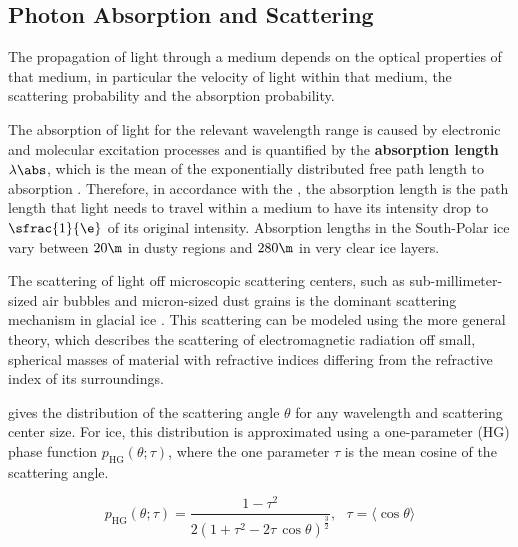 \subsection{Photon Absorption and Scattering}
\label{sec:scattering}

The propagation of light through a medium depends on the optical properties of that medium, in particular the velocity of light within that medium, the scattering probability and the absorption probability. \cite{lundberg}

The absorption of light for the relevant wavelength range is caused by electronic and molecular excitation processes \cite{lundberg}
and is quantified by the \textbf{absorption length} $\lambda\abs$, which is the mean of the exponentially distributed free path length to absorption \cite{lundberg}.
Therefore, in accordance with the , the absorption length is the path length that light needs to travel within a medium to have its intensity drop to $\sfrac{1}{\e}$ of its original intensity. \cite{lexikonderphysik}
Absorption lengths in the South-Polar ice vary between $20\m$ in dusty regions and $280\m$ in very clear ice layers. \cite{ackermann, ppcpaper, icepaper}

The scattering of light off microscopic scattering centers, such as sub-millimeter-sized air bubbles and micron-sized dust grains \cite{Price1997, ackermann} is the dominant scattering mechanism in glacial ice \cite{Askebjer1997, lundberg}. This scattering can be modeled using the more general  theory, which describes the scattering of electromagnetic radiation off small, spherical masses of material with refractive indices differing from the refractive index of its surroundings. \cite{Mie1908, ackermann, lundberg}

 gives the distribution of the scattering angle $\theta$ for any wavelength and scattering center size. For ice, this distribution is approximated using a one-parameter  (HG) phase function $p_\text{HG}(\theta; \tau)$, where the one parameter $\tau$ is the mean cosine of the scattering angle. \cite{lundberg}

\newcommand\meancostheta{\langle \cos \theta \rangle}
$$ p_\text{HG}(\theta; \tau) = \frac{1 - \tau^2}{2(1 + \tau^2 - 2\tau\, \cos \theta)^\frac{3}{2}}, \ \ \ \tau = \meancostheta $$

